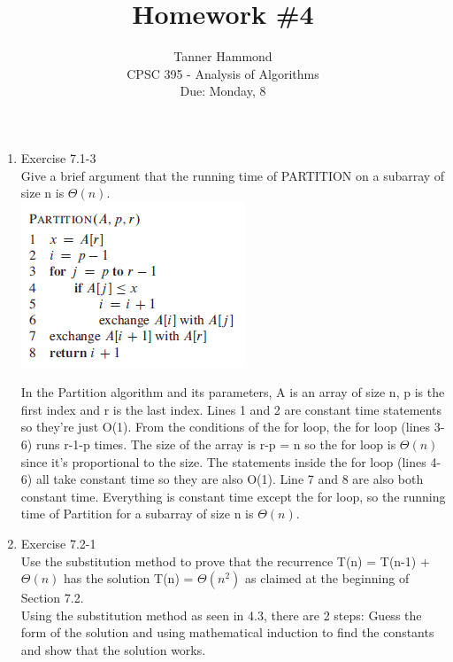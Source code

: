\documentclass[12pt]{article}
\begin{document}
 
 
 
\title{Homework \#4}%
\author{Tanner Hammond\\ %
CPSC 395 - Analysis of Algorithms
\\ Due: Monday, 8} %
\date{}
\maketitle

\begin{enumerate}
\item Exercise 7.1-3 \\
Give a brief argument that the running time of PARTITION on a subarray of size n is $\Theta(n)$. \\
\includegraphics[scale=1]{Partition.png}

In the Partition algorithm and its parameters, A is an array of size n, p is the first index and r is the last index. Lines 1 and 2 are constant time statements so they're just O(1). From the conditions of the for loop, the for loop (lines 3-6) runs r-1-p times. The size of the array is r-p = n so the for loop is $\Theta(n)$ since it's proportional to the size. The statements inside the for loop (lines 4-6) all take constant time so they are also O(1). Line 7 and 8 are also both constant time. Everything is constant time except the for loop, so the running time of Partition for a subarray of size n is $\Theta(n)$.

\item Exercise 7.2-1 \\
Use the substitution method to prove that the recurrence T(n) = T(n-1) + $\Theta(n)$ has the solution T(n) = $\Theta(n^2)$ as claimed at the beginning of Section 7.2. \\
Using the substitution method as seen in 4.3, there are 2 steps: Guess the form of the solution and using mathematical induction to find the constants and show that the solution works. \\


\end{enumerate}
\end{document}

